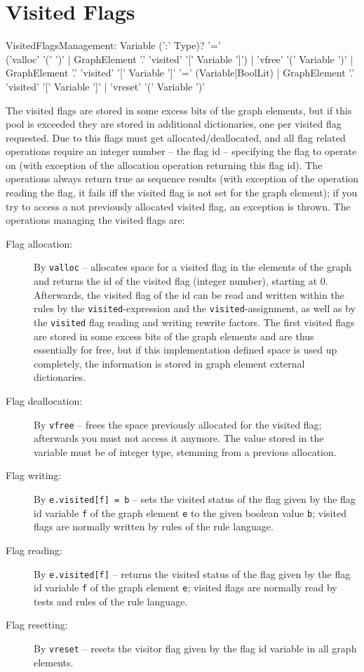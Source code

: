  
\section{Visited Flags}

\begin{rail}
  VisitedFlagsManagement:
    Variable (':' Type)? '=' \\('valloc' '(' ')' | GraphElement '.' 'visited' '[' Variable ']') |
    'vfree' '(' Variable ')' |
    GraphElement '.' 'visited' '[' Variable ']' '=' (Variable|BoolLit) |
    GraphElement '.' 'visited' '[' Variable ']' |
    'vreset' '(' Variable ')'
\end{rail}\label{allocvisitflag}\label{freevisitflag}
The visited flags are stored in some excess bits of the graph elements, but if this pool is exceeded they are stored in additional dictionaries, one per visited flag requested.
Due to this flags must get allocated/deallocated, and all flag related operations require an integer number -- the flag id -- specifying the flag to operate on (with exception of the allocation operation returning this flag id).
The operations always return true as sequence results (with exception of the operation reading the flag, it fails iff the visited flag is not set for the graph element);
if you try to access a not previously allocated visited flag, an exception is thrown.
The operations managing the visited flags are:
\begin{description}
\item[Flag allocation:] By \texttt{valloc} -- allocates space for a visited flag in the elements of the graph and returns the id of the visited flag (integer number), starting at 0.
Afterwards, the visited flag of the id can be read and written within the rules by the \texttt{visited}-expression and the \texttt{visited}-assignment,
as well as by the \texttt{visited} flag reading and writing rewrite factors.
The first visited flags are stored in some excess bits of the graph elements and are thus essentially for free,
but if this implementation defined space is used up completely, the information is stored in graph element external dictionaries.
\item[Flag deallocation:] By \texttt{vfree} -- frees the space previously allocated for the visited flag; afterwards you must not access it anymore. 
The value stored in the variable must be of integer type, stemming from a previous allocation.
\item[Flag writing:] By \texttt{e.visited[f] = b} -- sets the visited status of the flag given by the flag id variable \texttt{f} of the graph element \texttt{e} to the given boolean value \texttt{b}; visited flags are normally written by rules of the rule language.
\item[Flag reading:] By \texttt{e.visited[f]} -- returns the visited status of the flag given by the flag id variable \texttt{f} of the graph element \texttt{e}; visited flags are normally read by tests and rules of the rule language.
\item[Flag resetting:] By \texttt{vreset} -- resets the visitor flag given by the flag id variable in all graph elements.
\end{description}


